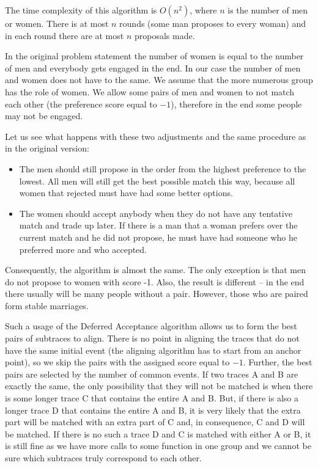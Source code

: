 The time complexity of this algorithm is $O(n^2)$, where $n$ is the number of men or women.
There is at most $n$ rounds (some man proposes to every woman) and in each round
there are at most $n$ proposals made.

In the original problem statement the number of women is equal to the number of men
and everybody gets engaged in the end.
In our case the number of men and women does not have to the same. We assume that
the more numerous group has the role of women. 
We allow some pairs of men and women to not match each other (the preference score equal to $-1$),
therefore in the end some people may not be engaged.

Let us see what happens with these two adjustments and the same procedure as in the original version:
\begin{itemize}
  \item The men should still propose in the order from the highest preference to the lowest. 
  			All men will still get the best possible match this way, 
  			because all women that rejected must have had some better options.
  \item The women should accept anybody when they do not have any tentative match and
           trade up later. If there is a man that a woman prefers over the current match and he did not
           propose, he must have had someone who he preferred more and who accepted.
\end{itemize}

Consequently, the algorithm is almost the same. The only exception is that men do not propose to women with score -1.
Also, the result is different -- in the end there usually will be many people without a pair. 
However, those who are paired form stable marriages.

Such a usage of the Deferred Acceptance algorithm allows us to form the best pairs of subtraces to align.
There is no point in aligning the traces that do not have the same initial event (the aligning algorithm has to
start from an anchor point), so we skip the pairs with the assigned score equal to $-1$. Further, the best pairs are
selected by the number of common events. If two traces A and B are exactly the same, the only possibility that they will
not be matched is when there is some longer trace C that contains the entire A and B. But, if there is also a longer trace D
that contains the entire A and B, it is very likely that the extra part will be matched with an extra part of C and,
in consequence, C and D will be matched. If there is no such a trace D and C is matched with either A or B, it is still
fine as we have more calls to some function in one group and we cannot be sure which subtraces truly
correspond to each other.


